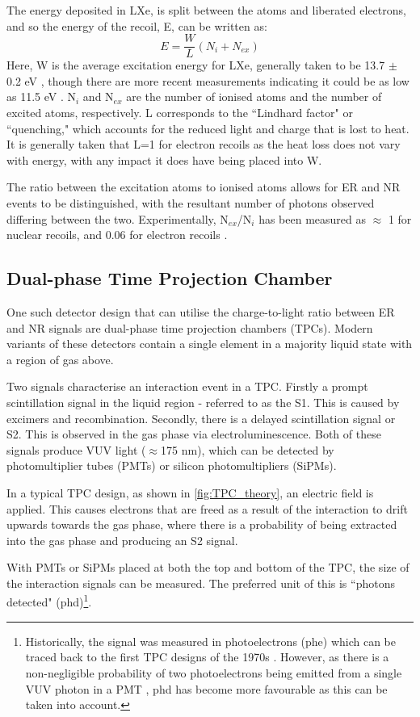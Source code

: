 \par
The energy deposited in LXe, is split between the atoms and liberated electrons, and so the energy of the recoil, E, can be written as:
\begin{equation}
    E = \frac{W}{L}(N_i + N_{ex})
\end{equation}
Here, W is the average excitation energy for LXe, generally taken to be 13.7 $\pm$ 0.2 eV \cite{light_and_charge_of_xenon_ref}, though there are more recent measurements indicating it could be as low as 11.5 eV \cite{electron_excitation_energy_of_xenon_ref}. 
N$_i$ and N$_{ex}$ are the number of ionised atoms and the number of excited atoms, respectively.
L corresponds to the ``Lindhard factor" or ``quenching," which accounts for the reduced light and charge that is lost to heat.
It is generally taken that L=1 for electron recoils as the heat loss does not vary with energy, with any impact it does have being placed into W.
\par
The ratio between the excitation atoms to ionised atoms allows for ER and NR events to be distinguished, with the resultant number of photons observed differing between the two.
Experimentally, N$_{ex}$/N$_i$ has been measured as $\approx$ 1 for nuclear recoils, and 0.06 for electron recoils \cite{ionisation_to_excitation_ratio_xenon_ref}.

\subsection{Dual-phase Time Projection Chamber}
\par
One such detector design that can utilise the charge-to-light ratio between ER and NR signals are dual-phase time projection chambers (TPCs).
Modern variants of these detectors contain a single element in a majority liquid state with a region of gas above.
\par
Two signals characterise an interaction event in a TPC.
Firstly a prompt scintillation signal in the liquid region - referred to as the S1.
This is caused by excimers and recombination.
Secondly, there is a delayed scintillation signal or S2.
This is observed in the gas phase via electroluminescence.
Both of these signals produce VUV light ($\approx$175 nm), which can be detected by photomultiplier tubes (PMTs) or silicon photomultipliers (SiPMs).
\par
In a typical TPC design, as shown in \autoref{fig:TPC_theory}, an electric field is applied.
This causes electrons that are freed as a result of the interaction to drift upwards towards the gas phase, where there is a probability of being extracted into the gas phase and producing an S2 signal.
\par
With PMTs or SiPMs placed at both the top and bottom of the TPC, the size of the interaction signals can be measured.
The preferred unit of this is ``photons detected" (phd)\footnote{Historically, the signal was measured in photoelectrons (phe) which can be traced back to the first TPC designs of the 1970s \cite{tpc_origins_ref}. However, as there is a non-negligible probability of two photoelectrons being emitted from a single VUV photon in a PMT \cite{pmts_in_xenon_ref}, phd has become more favourable as this can be taken into account.}.

